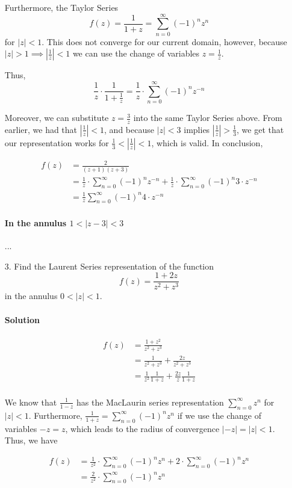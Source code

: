 \documentclass[11pt]{article}
\begin{document}
\begin{enumerate}
	Furthermore, the Taylor Series
	\[f(z) = \frac{1}{1 + z} = \sum^{\infty}_{n = 0} (-1)^n z^n\]
	for $|z| < 1$. This does not converge for our current domain, however, because $|z| > 1 \implies |\frac{1}{z}| < 1$ we can use the change of variables $z = \frac{1}{z}$.
	
	Thus,
	\[\frac{1}{z} \cdot \frac{1}{1 + \frac{1}{z}} = \frac{1}{z}\cdot \sum^{\infty}_{n = 0} (-1)^n z^{-n}\]
	
	Moreover, we can substitute $z = \frac{3}{z}$ into the same Taylor Series above. From earlier, we had that $|\frac{1}{z}| < 1$, and because $|z| < 3$ implies $|\frac{1}{z}| > \frac{1}{3}$, we get that our representation works for $\frac{1}{3} < |\frac{1}{z}| < 1$, which is valid. In conclusion,
	
	\[\begin{aligned}f(z)
		&= \frac{2}{(z+1)(z+3)} \\
		&=
		\frac{1}{z}\cdot \sum^{\infty}_{n = 0} (-1)^n z^{-n} +
		\frac{1}{z}\cdot \sum^{\infty}_{n = 0} (-1)^n 3\cdot z^{-n} \\
		&= \frac{1}{z} \sum^{\infty}_{n = 0} (-1)^n 4\cdot z^{-n}
	\end{aligned}\]
	
	\paragraph{In the annulus $1 < |z - 3| < 3$}
	...
	
	\item[3.] Find the Laurent Series representation of the function
	\[f(z) = \frac{1 + 2z}{z^2 + z^3} \]
	in the annulus $0 < |z| < 1$.
	
	\paragraph{Solution}
	\[\begin{aligned}	
	f(z) &= \frac{1 + z^2}{z^2 + z^3} \\
	&= \frac{1}{z^2 + z^3} + \frac{2z}{z^2 + z^3} \\
	&= \frac{1}{z^2}\frac{1}{1+z} + \frac{2z}{z}\frac{1}{1 + z} \\
	\end{aligned}\]
	
	We know that $\frac{1}{1 - z}$ has the MacLaurin series representation $\sum^{\infty}_{n=0} z^n$ for $|z| < 1$. Furthermore, $\frac{1}{1 + z}= \sum^{\infty}_{n=0} (-1)^nz^n$ if we use the change of variables $-z = z$, which leads to the radius of convergence $|-z| = |z| < 1$. Thus, we have

	\[\begin{aligned}
	f(z) &= \frac{1}{z^2} \cdot \sum^{\infty}_{n=0} (-1)^nz^n + 2 \cdot \sum^{\infty}_{n=0} (-1)^nz^n \\
	&= \frac{2}{z^2} \cdot \sum^{\infty}_{n=0} (-1)^nz^n
	\end{aligned}\]
	
\end{enumerate}
\end{document}
